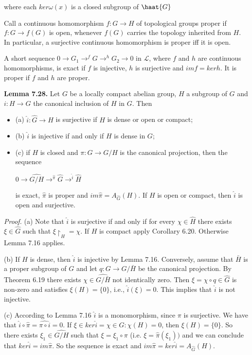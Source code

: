 \documentclass[12pt]{article}
\begin{document}
\begin{itemize}
\begin{itemize}
where each $ker \omega(x)$ is a closed subgroup of $\haat{G}$


Call a continuous homomorphism $f : G \to H$ of topological groups proper if $f : G \to f(G)$ is open, whenever
$f(G)$ carries the topology inherited from $H$. In particular, a surjective continuous homomorphism is proper iff
it is open.


    A short sequence $0 \to G_1 \to^f G \to^h G_2 \to 0$ in $\mathcal{L}$, where $f$ and $h$ are continuous homomorphisms, is exact if
$f$ is injective, $h$ is surjective and $im f = ker h$. It is proper if $f$ and $h$ are proper.


\textbf{Lemma 7.28.} Let $G$ be a locally compact abelian group, $H$ a subgroup of $G$ and $i : H \to G$ the canonical
inclusion of $H$ in $G$. Then


\begin{itemize}

    \item (a) $\hat{i} : \hat{G} \to \hat{H}$ is surjective if $H$ is dense or open or compact;

    \item (b) $\hat{i}$ is injective if and only if $H$ is dense in $G$;

    \item (c) if $H$ is closed and $\pi : G \to G/H$ is the canonical projection, then the sequence
    
            $0 \to \hat{G/H} \to^{\hat{\pi}} \hat{G} \to^{\hat{i}} \hat{H}$

        is exact, $\hat{\pi}$ is proper and $im \hat{\pi} = A_{\hat{G}}(H)$. If $H$ is open or compact, then $\hat{i}$ is open and surjective.
\end{itemize}


\emph{Proof.} (a) Note that $\hat{i}$ is surjective if and only if for every $\chi \in \hat{H}$ there exists $\xi \in \hat{G}$ such that $\xi \upharpoonright_H = \chi$. If $H$ is
compact apply Corollary 6.20. Otherwise Lemma 7.16 applies.


    (b) If $H$ is dense, then $\hat{i}$ is injective by Lemma 7.16. Conversely, assume that $\bar{H}$ is a proper subgroup of $G$
and let $q : G \to G/\bar{H}$ be the canonical projection. By Theorem 6.19 there exists $\chi \in \hat{G/\bar{H}}$ not identically zero.
Then $\xi = \chi \circ q \in \hat{G}$ is non-zero and satisfies $\xi(H) = \{0\}$, i.e., $\hat{i}(\xi) = 0$. This implies that $\hat{i}$ is not injective.


    (c) According to Lemma 7.16 $\hat{i}$ is a monomorphism, since $\pi$ is surjective. We have that $\hat{i} \circ \hat{\pi} = \hat{\pi \circ i} = 0$.
If $\xi \in ker \hat{i} = {\chi \in \hat{G} : \chi(H) = {0}}$, then $\xi(H) = \{0\}$. So there exists $\xi_1 \in \hat{G/H}$ such that $\xi = \xi_1 \circ \pi$ (i.e.
$\xi = \hat{\pi}(\xi_1))$ and we can conclude that $ker \hat{i} = im \hat{\pi}$. So the sequence is exact and $im \hat{\pi} = ker \hat{i} = A_{\hat{G}}(H)$.



\end{itemize}
\end{itemize}
\end{document}
